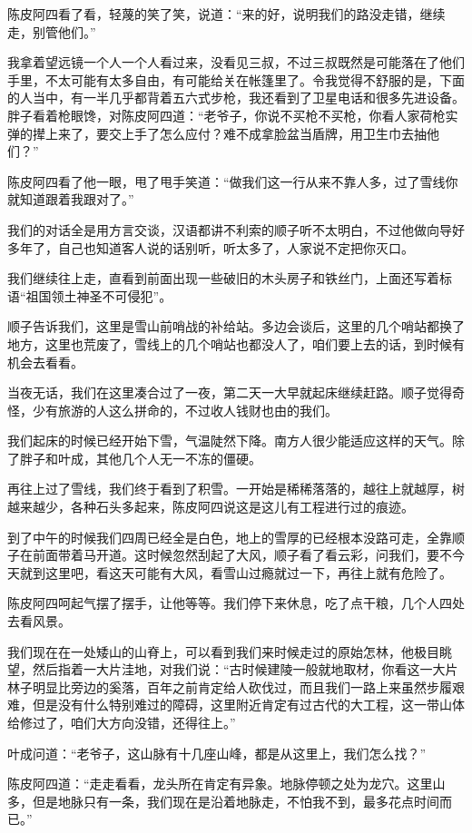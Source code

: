 陈皮阿四看了看，轻蔑的笑了笑，说道：“来的好，说明我们的路没走错，继续走，别管他们。”

我拿着望远镜一个人一个人看过来，没看见三叔，不过三叔既然是可能落在了他们手里，不太可能有太多自由，有可能给关在帐篷里了。令我觉得不舒服的是，下面的人当中，有一半几乎都背着五六式步枪，我还看到了卫星电话和很多先进设备。胖子看着枪眼馋，对陈皮阿四道：“老爷子，你说不买枪不买枪，你看人家荷枪实弹的撵上来了，要交上手了怎么应付？难不成拿脸盆当盾牌，用卫生巾去抽他们？”

陈皮阿四看了他一眼，甩了甩手笑道：“做我们这一行从来不靠人多，过了雪线你就知道跟着我跟对了。”

我们的对话全是用方言交谈，汉语都讲不利索的顺子听不太明白，不过他做向导好多年了，自己也知道客人说的话别听，听太多了，人家说不定把你灭口。

我们继续往上走，直看到前面出现一些破旧的木头房子和铁丝门，上面还写着标语“祖国领土神圣不可侵犯”。

顺子告诉我们，这里是雪山前哨战的补给站。多边会谈后，这里的几个哨站都换了地方，这里也荒废了，雪线上的几个哨站也都没人了，咱们要上去的话，到时候有机会去看看。

当夜无话，我们在这里凑合过了一夜，第二天一大早就起床继续赶路。顺子觉得奇怪，少有旅游的人这么拼命的，不过收人钱财也由的我们。

我们起床的时候已经开始下雪，气温陡然下降。南方人很少能适应这样的天气。除了胖子和叶成，其他几个人无一不冻的僵硬。

再往上过了雪线，我们终于看到了积雪。一开始是稀稀落落的，越往上就越厚，树越来越少，各种石头多起来，陈皮阿四说这是这儿有工程进行过的痕迹。

到了中午的时候我们四周已经全是白色，地上的雪厚的已经根本没路可走，全靠顺子在前面带着马开道。这时候忽然刮起了大风，顺子看了看云彩，问我们，要不今天就到这里吧，看这天可能有大风，看雪山过瘾就过一下，再往上就有危险了。

陈皮阿四呵起气摆了摆手，让他等等。我们停下来休息，吃了点干粮，几个人四处去看风景。

我们现在在一处矮山的山脊上，可以看到我们来时候走过的原始怎林，他极目眺望，然后指着一大片洼地，对我们说：“古时候建陵一般就地取材，你看这一大片林子明显比旁边的奚落，百年之前肯定给人砍伐过，而且我们一路上来虽然步履艰难，但是没有什么特别难过的障碍，这里附近肯定有过古代的大工程，这一带山体给修过了，咱们大方向没错，还得往上。”

叶成问道：“老爷子，这山脉有十几座山峰，都是从这里上，我们怎么找？”

陈皮阿四道：“走走看看，龙头所在肯定有异象。地脉停顿之处为龙穴。这里山多，但是地脉只有一条，我们现在是沿着地脉走，不怕我不到，最多花点时间而已。”

